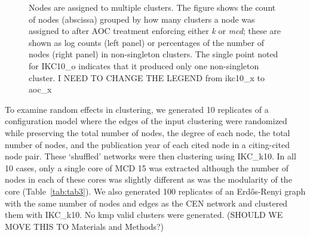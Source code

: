 \documentclass[11pt, oneside]{article}   	%
\begin{document}
\begin{figure}[H]
\begin{subfigure}[t]{0.48\textwidth}
    	\end{subfigure}
\caption{Nodes are assigned to multiple clusters. The figure shows the count of nodes (abscissa) grouped by how many clusters a node was assigned to after AOC treatment enforcing either \emph{k} or \emph{mcd};  these are shown as log counts (left panel) or percentages of the number of nodes (right panel) in non-singleton clusters. 
The single point noted for IKC10\_o indicates that it produced only one non-singleton cluster. I NEED TO CHANGE THE LEGEND from ikc10\_x to aoc\_x}
\label{fig:fig2}
\end{figure}


To examine random effects in clustering, we generated 10 replicates of a configuration model where the edges of the input clustering were randomized while preserving the total number of nodes, the degree of each node, the total number of nodes, and the publication year of each cited node in a citing-cited node pair. These `shuffled' networks were then clustering using IKC\_k10. In all 10 cases, only a single core of MCD 15 was extracted although the number of nodes in each of these cores was slightly different as was the modularity of the core (Table~\ref{tab:tab3}). We also generated 100 replicates of an Erd\H{o}s-Renyi graph with the same number of nodes and edges as the CEN network and clustered them with IKC\_k10. No kmp valid clusters were generated. (SHOULD WE MOVE THIS TO Materials and Methods?)

\end{document}
